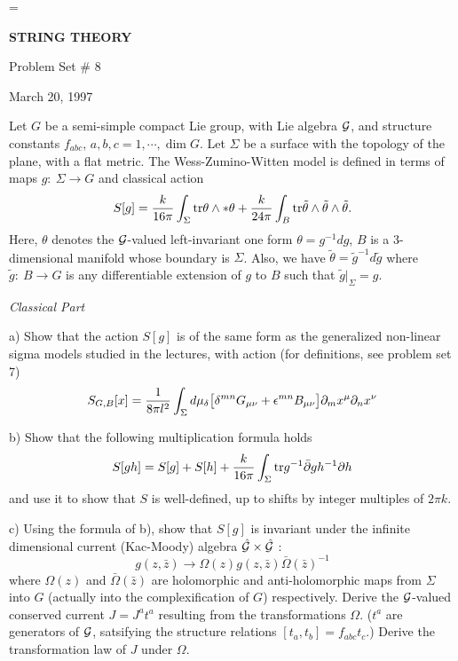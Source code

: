 

\magnification=
\overfullrule=0pt
\baselineskip=17pt
\def\det{{\rm det}}
\def\Det{{\rm Det}}
\def\tr{{\rm tr}}
\def\Tr{{\rm Tr}}
\def\12{{1 \over 2}}
\def\ker{{\rm Ker}}
\def\O{{\cal O}}
\def\G{{\cal G}}

\centerline{{\bf STRING THEORY}}
\centerline{ Problem Set \# 8}
\centerline{March 20, 1997}

\bigskip
\bigskip

Let $G$ be a semi-simple compact Lie group, with Lie algebra $\G$,
and structure constants $f_{abc}$, $a,b,c = 1,\cdots , \dim G$.
Let $\Sigma$ be a surface with the topology of the plane, with
a flat metric. The Wess-Zumino-Witten model is defined in terms 
of maps $g :~ \Sigma \to G$ and classical action 
$$
S[g] = { k \over 16 \pi } \int _\Sigma \tr \theta \wedge * \theta
+ { k \over 24 \pi} \int _B \tr \tilde \theta \wedge \tilde \theta
\wedge \tilde \theta .
$$
Here, $\theta$ denotes the $\G$-valued left-invariant one form 
$\theta = g^{-1} dg$, $B$ is a 3-dimensional manifold whose boundary
is $\Sigma$. Also,  we have
$\tilde \theta = \tilde g ^{-1}  d \tilde g$ where 
$\tilde g :~ B \to G$ is any differentiable extension of $g$ to 
$B$ such that $\tilde g |_\Sigma = g$.

\medskip

\noindent
{\it Classical Part}

\medskip

a) Show that the action $S[g]$ is of the same form as the generalized
non-linear sigma models studied in the lectures, with action (for 
definitions, see problem set 7)
$$
S_{G,B}[x] = {1 \over 8 \pi l^2} \int _\Sigma d \mu _\delta 
\bigl [ \delta ^{mn} G_{\mu \nu} + \epsilon ^{mn} B_{\mu \nu} \bigr ]
\partial _m x^\mu \partial _n x ^\nu 
$$

b) Show that the following multiplication formula holds
$$
S[gh] = S[g] + S[h] + {k \over 16 \pi} \int _\Sigma \tr
g^{-1} \bar \partial g h^{-1} \partial h
$$
and use it to show that $S$ is well-defined, 
up to shifts by integer multiples
of $2 \pi k$.

c) Using the formula of b), show that $S[g]$ is invariant under the 
infinite dimensional current (Kac-Moody) algebra $\hat \G \times \hat \G$ :
$$
 g(z,\bar z) \to \Omega (z) g(z,\bar z) \bar \Omega (\bar z) ^{-1}
$$
where $\Omega (z)$ and $\bar \Omega (\bar z)$ are holomorphic
and anti-holomorphic maps from $\Sigma$ into $G$ (actually into
the complexification of $G$) respectively.
Derive the $\G$-valued conserved current $J= J^a t^a$ resulting from
the transformations $\Omega$. ($t^a$ are generators of $\G$,
satsifying the structure relations $[t_a, t_b] =  f_{abc} t_c$.)
Derive the transformation law of $J$ under $\Omega$. 

